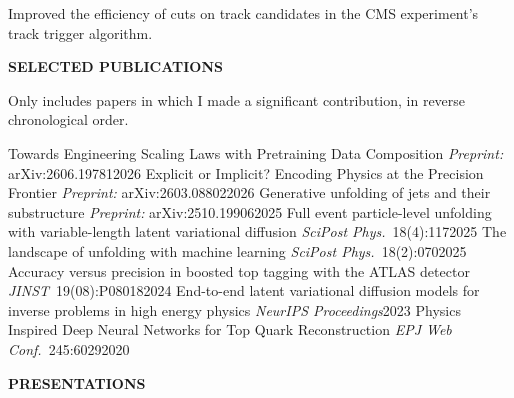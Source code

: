 {%
  {Improved the efficiency of cuts on track candidates in the CMS experiment's
   track trigger algorithm.}

\vspace{0.5em}

\textbf{SELECTED PUBLICATIONS}
\vspace{0.5em}

{\small Only includes papers in which I made a significant contribution,
in reverse chronological order.}
\vspace{0.3em}

\begin{enumerate}
    {Towards Engineering Scaling Laws with Pretraining Data Composition}%
    {\textit{Preprint:} arXiv:2606.19781}{2026}
    {Explicit or Implicit? Encoding Physics at the Precision Frontier}%
    {\textit{Preprint:} arXiv:2603.08802}{2026}
    {Generative unfolding of jets and their substructure}%
    {\textit{Preprint:} arXiv:2510.19906}{2025}
    {Full event particle-level unfolding with variable-length latent variational diffusion}%
    {\textit{SciPost Phys.}~18(4):117}{2025}
    {The landscape of unfolding with machine learning}%
    {\textit{SciPost Phys.}~18(2):070}{2025}
    {Accuracy versus precision in boosted top tagging with the ATLAS detector}%
    {\textit{JINST}~19(08):P08018}{2024}
    {End-to-end latent variational diffusion models for inverse problems in high energy physics}%
    {\textit{NeurIPS Proceedings}}{2023}
    {Physics Inspired Deep Neural Networks for Top Quark Reconstruction}%
    {\textit{EPJ Web Conf.}~245:6029}{2020}
\end{enumerate}

\vspace{0.5em}

\textbf{PRESENTATIONS}
\vspace{0.5em}

}
